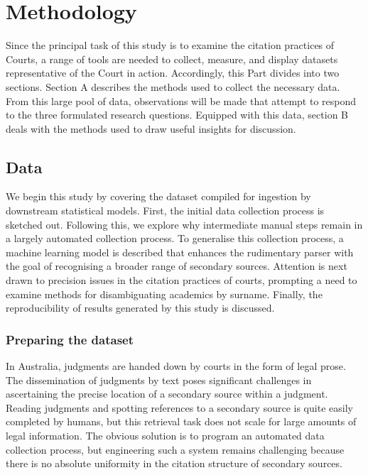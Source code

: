 \let\xn\xnote
\section{Methodology}

Since the principal task of this study is to examine the citation practices of Courts, a range of tools are needed to collect, measure, and display datasets representative of the Court in action. Accordingly, this Part divides into two sections. Section A describes the methods used to collect the necessary data. From this large pool of data, observations will be made that attempt to respond to the three formulated research questions. Equipped with this data, section B deals with the methods used to draw useful insights for discussion.

\subsection{Data}

We begin this study by covering the dataset compiled for ingestion by downstream statistical models. First, the initial data collection process is sketched out. Following this, we explore why intermediate manual steps remain in a largely automated collection process. To generalise this collection process, a machine learning model is described that enhances the rudimentary parser with the goal of recognising a broader range of secondary sources. Attention is next drawn to precision issues in the citation practices of courts, prompting a need to examine methods for disambiguating academics by surname. Finally, the reproducibility of results generated by this study is discussed.

\subsubsection{Preparing the dataset}

In Australia, judgments are handed down by courts in the form of legal prose.\xn{3-1} The dissemination of judgments by text poses significant challenges in ascertaining the precise location of a secondary source within a judgment. Reading judgments and spotting references to a secondary source is quite easily completed by humans,\xn{3-2} but this retrieval task does not scale for large amounts of legal information. The obvious solution is to program an automated data collection process, but engineering such a system remains challenging because there is no absolute uniformity in the citation structure of secondary sources.\xn{3-3} 

